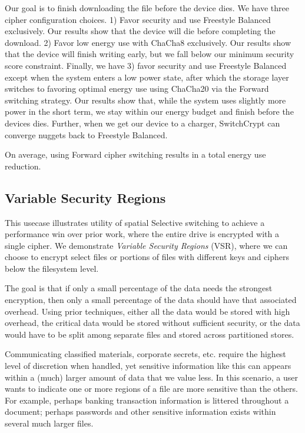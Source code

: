 Our goal is to finish downloading the file before the device dies. We have three
cipher configuration choices. 1) Favor security and use Freestyle Balanced
exclusively. Our results show that the device will die before completing the
download. 2) Favor low energy use with ChaCha8 exclusively. Our results show
that the device will finish writing early, but we fall below our minimum
security score constraint. Finally, we have 3) favor security and use Freestyle
Balanced except when the system enters a low power state, after which the
storage layer switches to favoring optimal energy use using ChaCha20 via the
Forward switching strategy. Our results show that, while the system uses
slightly more power in the short term, we stay within our energy budget and
finish before the devices dies. Further, when we get our device to a charger,
SwitchCrypt can converge nuggets back to Freestyle Balanced.

On average, using Forward cipher switching results in a  total energy
use reduction.

\subsection{Variable Security Regions}

This usecase illustrates utility of spatial Selective switching to achieve a
performance win over prior work, where the entire drive is encrypted with a
single cipher. We demonstrate \emph{Variable Security Regions} (VSR), where we
can choose to encrypt select files or portions of files with different keys and
ciphers below the filesystem level. 

The goal is that if only a small percentage
of the data needs the strongest encryption, then only a small percentage of the
data should have that associated overhead.  Using prior techniques, either all 
the data would be stored with high overhead, the critical data would be stored 
without sufficient security, or the data would have to be split among separate 
files and stored across partitioned stores.

Communicating classified materials, corporate secrets, etc. require the highest
level of discretion when handled, yet sensitive information like this can
appears within a (much) larger amount of data that we value less. In this
scenario, a user wants to indicate one or more regions of a file are more
sensitive than the others. For example, perhaps banking transaction information
is littered throughout a document; perhaps passwords and other sensitive
information exists within several much larger files.

